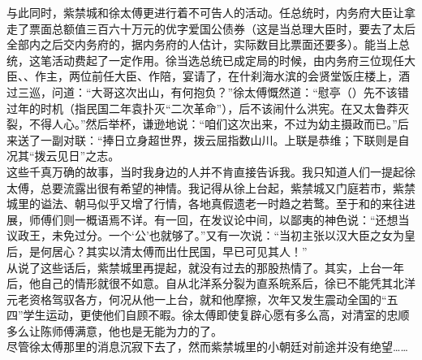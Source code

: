 与此同时，紫禁城和徐太傅更进行着不可告人的活动。任总统时，内务府大臣让拿走了票面总额值三百六十万元的优字爱国公债券（这是当总理大臣时，要去了太后全部内之后交内务府的，据内务府的人估计，实际数目比票面还要多）。能当上总统，这笔活动费起了一定作用。徐当选总统已成定局的时候，由内务府三位现任大臣、、作主，两位前任大臣、作陪，宴请了，在什刹海水滨的会贤堂饭庄楼上，酒过三巡，问道：“大哥这次出山，有何抱负？”徐太傅慨然道：“慰亭（）先不该错过年的时机（指民国二年袁扑灭“二次革命”），后不该闹什么洪宪。在又太鲁莽灭裂，不得人心。”然后举杯，谦逊地说：“咱们这次出来，不过为幼主摄政而已。”后来送了一副对联：“捧日立身超世界，拨云屈指数山川。上联是恭维；下联则是自况其“拨云见日”之志。\\

这些千真万确的故事，当时我身边的人并不肯直接告诉我。我只知道人们一提起徐太傅，总要流露出很有希望的神情。我记得从徐上台起，紫禁城又门庭若市，紫禁城里的谥法、朝马似乎又增了行情，各地真假遗老一时趋之若鹜。至于和的来往进展，师傅们则一概语焉不详。有一回，在发议论中间，以鄙夷的神色说：“还想当议政王，未免过分。一个‘公’也就够了。”又有一次说：“当初主张以汉大臣之女为皇后，是何居心？其实以清太傅而出仕民国，早已可见其人！”\\

从说了这些话后，紫禁城里再提起，就没有过去的那股热情了。其实，上台一年后，他自己的情形就很不如意。自从北洋系分裂为直系皖系后，徐已不能凭其北洋元老资格驾驭各方，何况从他一上台，就和他摩擦，次年又发生震动全国的“五四”学生运动，更使他们自顾不暇。徐太傅即使复辟心愿有多么高，对清室的忠顺多么让陈师傅满意，他也是无能为力的了。\\

尽管徐太傅那里的消息沉寂下去了，然而紫禁城里的小朝廷对前途并没有绝望……
